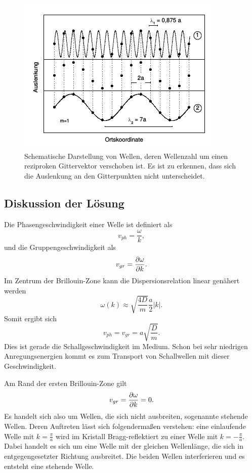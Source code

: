 \begin{figure}[tb]
  \centering
  \includegraphics[scale=1.0]{./fig/auslenkung.png}
  \caption{Schematische Darstellung von Wellen, deren Wellenzahl um einen reziproken Gittervektor verschoben ist. Es ist zu erkennen, dass sich die Auslenkung an den Gitterpunkten nicht unterscheidet. \cite{Litmap}}
  \label{fig:auslenkung}
\end{figure}

\subsection{Diskussion der Lösung}

Die Phasengeschwindigkeit einer Welle ist definiert als
\begin{equation}
 v_{ph} = \frac{\omega}{k},
\end{equation}
und die Gruppengeschwindigkeit als
\begin{equation}
 v_{gr} = \frac{\partial \omega}{\partial k}.
\end{equation}
Im Zentrum der Brillouin-Zone kann die Dispersionsrelation linear genähert werden
\begin{equation}
 \omega(k) \approx \sqrt{\frac{4D}{m}} \frac{a}{2} \lvert k\rvert .
\end{equation}
Somit ergibt sich
\begin{equation}
 v_{ph} = v_{gr} = a\sqrt{\frac{D}{m}}.
\end{equation}
Dies ist gerade die Schallgeschwindigkeit im Medium. Schon bei sehr niedrigen Anregungsenergien kommt es zum Transport von Schallwellen mit dieser Geschwindigkeit.

Am Rand der ersten Brillouin-Zone gilt
\begin{equation}
 v_{gr} = \frac{\partial \omega}{\partial k} = 0.
\end{equation}
Es handelt sich also um Wellen, die sich nicht ausbreiten, sogenannte stehende Wellen. Deren Auftreten lässt sich folgendermaßen verstehen: eine einlaufende Welle mit $k=\frac{\pi}{a}$ wird im Kristall Bragg-reflektiert zu einer Welle mit $k=-\frac{\pi}{a}$.
Dabei handelt es sich um eine Welle mit der gleichen Wellenlänge, die sich in entgegengesetzter Richtung ausbreitet. Die beiden Wellen interferieren und es entsteht eine stehende Welle. 

